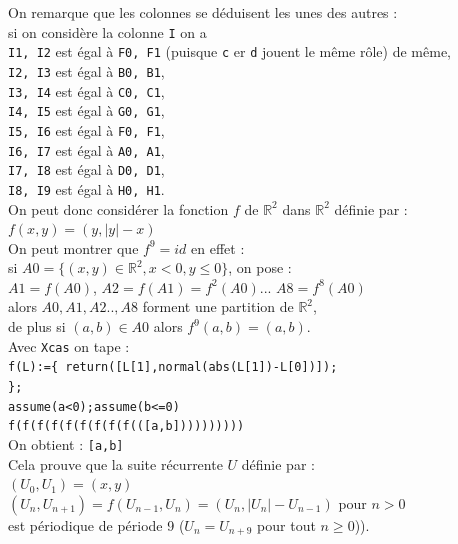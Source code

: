 \documentclass[a4paper,11pt]{book}
\begin{document}
On remarque que les colonnes se d\'eduisent les unes des autres :\\
si on consid\`ere la colonne {\tt I} on a \\
{\tt I1, I2} est \'egal \`a {\tt F0, F1} (puisque {\tt c} er {\tt d} jouent 
le m\^eme r\^ole) de m\^eme,\\
{\tt I2, I3} est \'egal \`a {\tt B0, B1},\\
{\tt I3, I4} est \'egal \`a {\tt C0, C1},\\
{\tt I4, I5} est \'egal \`a {\tt G0, G1},\\
{\tt I5, I6} est \'egal \`a {\tt F0, F1},\\
{\tt I6, I7} est \'egal \`a {\tt A0, A1},\\
{\tt I7, I8} est \'egal \`a {\tt D0, D1},\\
{\tt I8, I9} est \'egal \`a {\tt H0, H1}.\\
On peut donc consid\'erer la fonction $f$ de $\mathbb R^2$ dans  $\mathbb R^2$
d\'efinie par :\\
$f(x,y)=(y,|y|-x)$\\
On peut montrer que $f^9=id$ en effet :\\
si $A0=\{(x,y)\in \mathbb R^2, x<0, y \leq 0\}$, on pose :\\
$A1=f(A0)$, $A2=f(A1)=f^2(A0)$...
$A8=f^8(A0)$\\
alors $A0,A1,A2..,A8$ forment une partition de $\mathbb R^2$,\\
de plus si $(a,b)\in A0$ alors $f^9(a,b)=(a,b)$.\\
Avec {\tt Xcas} on tape :\\
{\tt f(L):=\{
return([L[1],normal(abs(L[1])-L[0])]);\\
\};}\\
{\tt assume(a<0);assume(b<=0)}\\
{\tt f(f(f(f(f(f(f(f(f(([a,b])))))))))}\\
On obtient : {\tt [a,b]}\\
Cela prouve que la suite r\'ecurrente $U$ d\'efinie par :\\
$(U_0,U_1)=(x,y)$\\
$(U_n,U_{n+1})=f(U_{n-1}, U_n)=(U_n,|U_n|-U_{n-1})$ pour $n>0$\\
est p\'eriodique de p\'eriode 9 ($U_n=U_{n+9}$ pour tout $n\geq 0$)).\\ 
\end{document}
